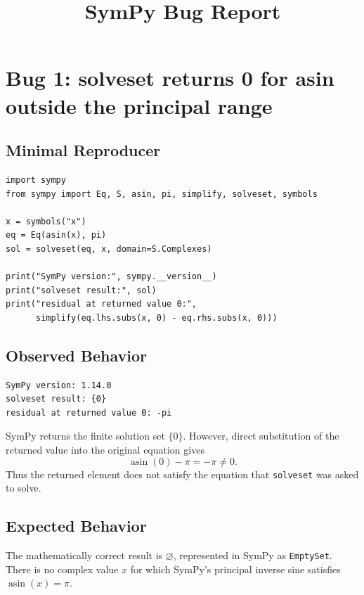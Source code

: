 \documentclass[11pt]{article}
\title{SymPy Bug Report}
\author{}
\date{}
\begin{document}
\maketitle

\section{Bug 1: solveset returns 0 for asin outside the principal range}

\subsection{Minimal Reproducer}

\medskip

\begin{lstlisting}[style=bugpython]
import sympy
from sympy import Eq, S, asin, pi, simplify, solveset, symbols

x = symbols("x")
eq = Eq(asin(x), pi)
sol = solveset(eq, x, domain=S.Complexes)

print("SymPy version:", sympy.__version__)
print("solveset result:", sol)
print("residual at returned value 0:",
      simplify(eq.lhs.subs(x, 0) - eq.rhs.subs(x, 0)))
\end{lstlisting}

\subsection{Observed Behavior}

\medskip

\begin{lstlisting}[style=bugpython]
SymPy version: 1.14.0
solveset result: {0}
residual at returned value 0: -pi
\end{lstlisting}

SymPy returns the finite solution set \(\{0\}\).  However, direct substitution
of the returned value into the original equation gives
\[
  \operatorname{asin}(0)-\pi = -\pi \ne 0.
\]
Thus the returned element does not satisfy the equation that \texttt{solveset}
was asked to solve.

\subsection{Expected Behavior}

The mathematically correct result is \(\varnothing\), represented in SymPy as
\texttt{EmptySet}.  There is no complex value \(x\) for which SymPy's principal
inverse sine satisfies \(\operatorname{asin}(x)=\pi\).
\end{document}

